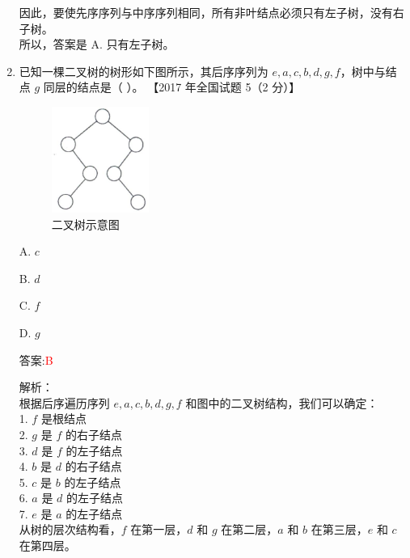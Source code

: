 \documentclass[lang=cn,newtx,10pt,scheme=chinese]{../../../elegantbook}
\begin{document}
\begin{enumerate}
        因此，要使先序序列与中序序列相同，所有非叶结点必须只有左子树，没有右子树。\\
        
        所以，答案是 A. 只有左子树。\\
    
        \item 已知一棵二叉树的树形如下图所示，其后序序列为 $e, a, c, b, d, g, f$，树中与结点 $g$ 同层的结点是（ ）。  
        【2017 年全国试题 5（2 分）】  
    
        \begin{figure}[h!]
                \centering
                \includegraphics[width=0.3\textwidth]{../../figure/exercisePicPDF/chapter6/6-6.pdf}
                \caption{二叉树示意图}
        \end{figure}
    
        A. $c$  
    
        B. $d$  
    
        C. $f$  
    
        D. $g$  
    
        答案:\textcolor{red}{B}
        
        解析：\\
        根据后序遍历序列 $e, a, c, b, d, g, f$ 和图中的二叉树结构，我们可以确定：\\
        1. $f$ 是根结点\\
        2. $g$ 是 $f$ 的右子结点\\
        3. $d$ 是 $f$ 的左子结点\\
        4. $b$ 是 $d$ 的右子结点\\
        5. $c$ 是 $b$ 的左子结点\\
        6. $a$ 是 $d$ 的左子结点\\
        7. $e$ 是 $a$ 的左子结点\\
        
        从树的层次结构看，$f$ 在第一层，$d$ 和 $g$ 在第二层，$a$ 和 $b$ 在第三层，$e$ 和 $c$ 在第四层。\\
        

\end{enumerate}
\end{document}
